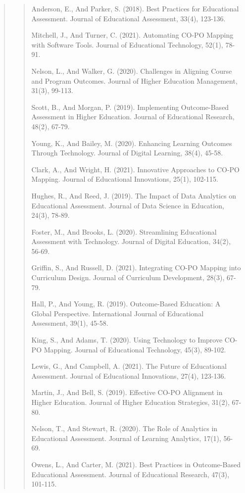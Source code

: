 \documentclass[12pt]{report}
\begin{document}
\begin{quote}
\begin{quote}
			Anderson, E., And Parker, S. (2018). Best Practices for Educational Assessment. Journal of Educational Assessment, 33(4), 123-136.
			
			Mitchell, J., And Turner, C. (2021). Automating CO-PO Mapping with Software Tools. Journal of Educational Technology, 52(1), 78-91.
			
			Nelson, L., And Walker, G. (2020). Challenges in Aligning Course and Program Outcomes. Journal of Higher Education Management, 31(3), 99-113.
			
			Scott, B., And Morgan, P. (2019). Implementing Outcome-Based Assessment in Higher Education. Journal of Educational Research, 48(2), 67-79.
			
			Young, K., And Bailey, M. (2020). Enhancing Learning Outcomes Through Technology. Journal of Digital Learning, 38(4), 45-58.
			
			Clark, A., And Wright, H. (2021). Innovative Approaches to CO-PO Mapping. Journal of Educational Innovations, 25(1), 102-115.
			
			Hughes, R., And Reed, J. (2019). The Impact of Data Analytics on Educational Assessment. Journal of Data Science in Education, 24(3), 78-89.
			\clearpage
			
			Foster, M., And Brooks, L. (2020). Streamlining Educational Assessment with Technology. Journal of Digital Education, 34(2), 56-69.
			
			Griffin, S., And Russell, D. (2021). Integrating CO-PO Mapping into Curriculum Design. Journal of Curriculum Development, 28(3), 67-79.
			
			Hall, P., And Young, R. (2019). Outcome-Based Education: A Global Perspective. International Journal of Educational Assessment, 39(1), 45-58.
			
			King, S., And Adams, T. (2020). Using Technology to Improve CO-PO Mapping. Journal of Educational Technology, 45(3), 89-102.
			
			Lewis, G., And Campbell, A. (2021). The Future of Educational Assessment. Journal of Educational Innovations, 27(4), 123-136.
			
			Martin, J., And Bell, S. (2019). Effective CO-PO Alignment in Higher Education. Journal of Higher Education Strategies, 31(2), 67-80.
			
			Nelson, T., And Stewart, R. (2020). The Role of Analytics in Educational Assessment. Journal of Learning Analytics, 17(1), 56-69.
			
			Owens, L., And Carter, M. (2021). Best Practices in Outcome-Based Educational Assessment. Journal of Educational Research, 47(3), 101-115.
			

\end{quote}
\end{quote}
\end{document}
